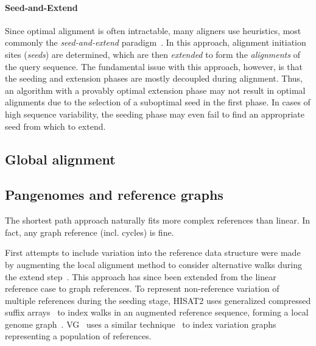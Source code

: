 \paragraph{Seed-and-Extend}
Since optimal alignment is often intractable, many aligners use heuristics, most
commonly the \emph{seed-and-extend}
paradigm~\cite{altschul_basic_1990,langmead_fast_2012,li_fast_2009}. In this
approach, alignment initiation sites (\emph{seeds}) are determined, which are
then \emph{extended} to form the \emph{alignments} of the query sequence. The
fundamental issue with this approach, however, is that the seeding and extension
phases are mostly decoupled during alignment. Thus, an algorithm with a provably
optimal extension phase may not result in optimal alignments due to the
selection of a suboptimal seed in the first phase. In cases of high sequence
variability, the seeding phase may even fail to find an appropriate seed from
which to extend.

\subsection{Global alignment}

\subsection{Pangenomes and reference graphs}

The shortest path approach naturally fits more complex references than linear.
In fact, any graph reference (incl. cycles) is fine.

First attempts to include variation into the reference data structure were made
by augmenting the local alignment method to consider alternative walks during the
extend step~\cite{schneeberger_simultaneous_2009,palmapper}. This approach has
since been extended from the linear reference case to graph references. To
represent non-reference variation of multiple references during the seeding
stage, HISAT2 uses generalized compressed suffix
arrays~\cite{siren_indexing_2014} to index walks in an augmented reference
sequence, forming a local genome graph~\cite{kim_graphbased_2019}.
VG~\cite{garrison_variation_2018} uses a similar
technique~\cite{siren_indexing_2017} to index variation graphs representing a
population of references.


